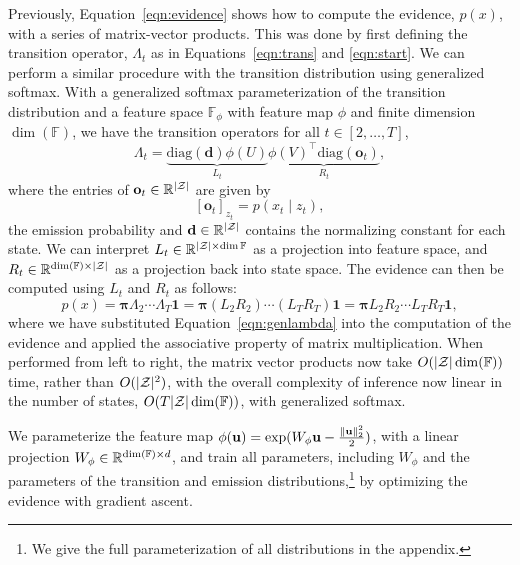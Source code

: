 \documentclass{article}
\begin{document}
Previously, Equation~\ref{eqn:evidence} shows how to compute the evidence,
$p(x)$, with a series of matrix-vector products.
This was done by first defining the transition operator,
$\Lambda_t$ as in Equations~\ref{eqn:trans} and \ref{eqn:start}.
We can perform a similar procedure with the transition distribution using generalized softmax.
With a generalized softmax parameterization of the transition distribution
and a feature space $\mathbb{F}_\phi$ with feature map $\phi$ and finite dimension $\dim(\mathbb{F})$,
we have the transition operators for all $t \in [2, \ldots, T]$,
\begin{equation}
\label{eqn:genlambda}
\Lambda_t =
\underbrace{\textrm{diag}(\mathbf{d})\phi(U)}_{L_t}\underbrace{{\phi(V)}^\top\textrm{diag}(\mathbf{o}_t)}_{R_t},
\end{equation}
where the entries of $\mathbf{o}_t\in\mathbb{R}^{|\mathcal{Z}|}$
are given by
$$
[\mathbf{o}_t]_{z_t} = p(x_t \mid z_t),
$$
the emission probability and $\mathbf{d}\in\mathbb{R}^{|\mathcal{Z}|}$ contains the normalizing constant
for each state.
We can interpret $L_t\in\mathbb{R}^{|\mathcal{Z}|\times\dim{\mathbb{F}}}$ as a 
projection into feature space, and $R_t\in\mathbb{R}^{\dim(\mathbb{F})\times|\mathcal{Z}|}$
as a projection back into state space.
The evidence can then be computed using $L_t$ and $R_t$ as follows:
\begin{equation}
\label{eqn:genevidence}
p(x)
= \bm\pi\Lambda_2\cdots\Lambda_T\mathbf{1}
= \bm\pi(L_2R_2)\cdots (L_TR_T)\mathbf{1}
= \bm\pi L_2R_2\cdots L_TR_T\mathbf{1},
\end{equation}
where we have substituted Equation~\ref{eqn:genlambda} into the computation of the evidence
and applied the associative property of matrix multiplication.
When performed from left to right, the matrix vector products now take $O(|\mathcal{Z}|\dim(\mathbb{F}))$
time, rather than $O(|\mathcal{Z}|^2)$,
with the overall complexity of inference now linear in the number of states,
$O(T|\mathcal{Z}|\dim(\mathbb{F}))$,
with generalized softmax.

We parameterize the feature map $\phi(\mathbf{u}) = \exp(W_\phi\mathbf{u} - \frac{\|\mathbf{u}\|_2^2}{2})$,
with a linear projection $W_\phi\in\mathbb{R}^{\dim(\mathbb{F})\times d}$,
and train all parameters,
including $W_\phi$ and the parameters of the transition and emission distributions,\footnote{
We give the full parameterization of all distributions in the appendix.
}
by optimizing the evidence with gradient ascent.
\end{document}
